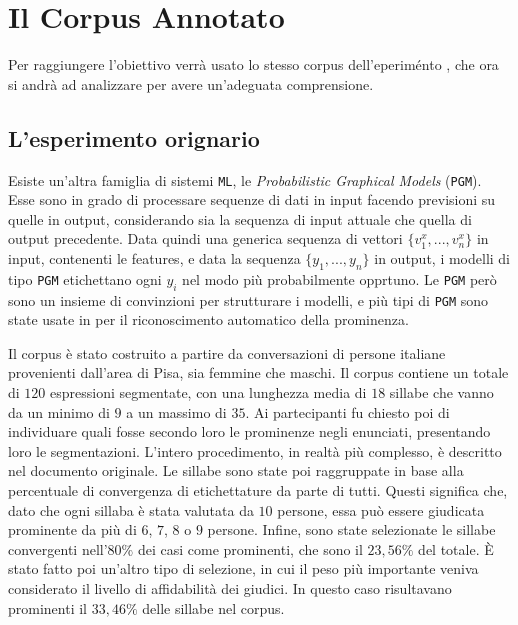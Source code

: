 \documentclass[twoside,twocolumn,11pt]{extarticle}
\theoremstyle{definition}
\begin{document}
\section{Il Corpus Annotato}\label{sec:corpus}
	Per raggiungere l'obiettivo verrà usato lo stesso corpus dell'eperiménto \cite{bib:prominence-detection-italian}, che ora si andrà ad analizzare per avere un'adeguata comprensione.
	
	\subsection{L'esperimento orignario}
		Esiste un'altra famiglia di sistemi \texttt{ML}, le \textit{Probabilistic Graphical Models} (\texttt{PGM}). Esse sono in grado di processare sequenze di dati in input facendo previsioni su quelle in output, considerando sia la sequenza di input attuale che quella di output precedente. Data quindi una generica sequenza di vettori $\{v^x_1, ..., v^x_n\}$ in input, contenenti le features, e data la sequenza $\{y_1, ..., y_n\}$ in output, i modelli di tipo \texttt{PGM} etichettano ogni $y_i$ nel modo più probabilmente opprtuno. Le \texttt{PGM} però sono un insieme di convinzioni per strutturare i modelli, e più tipi di \texttt{PGM} sono state usate in \cite{bib:prominence-detection-italian} per il riconoscimento automatico della prominenza.
	
		Il corpus è stato costruito a partire da conversazioni di persone italiane provenienti dall'area di Pisa, sia femmine che maschi. Il corpus contiene un totale di $120$ espressioni segmentate, con una lunghezza media di $18$ sillabe che vanno da un minimo di $9$ a un massimo di $35$. Ai partecipanti fu chiesto poi di individuare quali fosse secondo loro le prominenze negli enunciati, presentando loro le segmentazioni. L'intero procedimento, in realtà più complesso, è descritto nel documento originale. Le sillabe sono state poi raggruppate in base alla percentuale di convergenza di etichettature da parte di tutti. Questi significa che, dato che ogni sillaba è stata valutata da $10$ persone, essa può essere giudicata prominente da più di $6$, $7$, $8$ o $9$ persone. Infine, sono state selezionate le sillabe convergenti nell'$80\%$ dei casi come prominenti, che sono il $23,56\%$ del totale. È stato fatto poi un'altro tipo di selezione, in cui il peso più importante veniva considerato il livello di affidabilità dei giudici. In questo caso risultavano prominenti il $33,46\%$ delle sillabe nel corpus.
		
\end{document}
